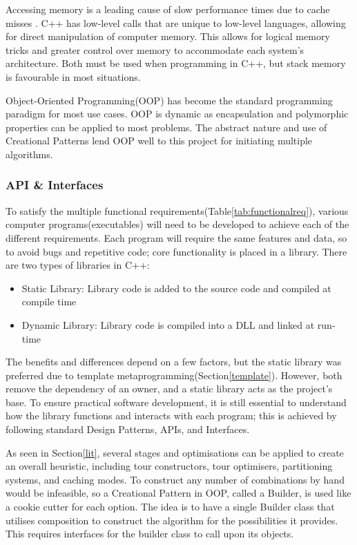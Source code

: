 Accessing memory is a leading cause of slow performance times due to cache misses \cite{drepper2007memory}. C++ has low-level calls that are unique to low-level languages, allowing for direct manipulation of computer memory. This allows for logical memory tricks and greater control over memory to accommodate each system's architecture\cite{memorymanagement}. Both must be used when programming in C++, but stack memory is favourable in most situations.

Object-Oriented Programming(OOP) has become the standard programming paradigm for most use cases. OOP is dynamic as encapsulation and polymorphic properties can be applied to most problems. The abstract nature and use of Creational Patterns lend OOP well to this project for initiating multiple algorithms.  

\subsubsection{API \& Interfaces}
\label{sec:API}

To satisfy the multiple functional requirements(Table\ref{tab:functionalreq}), various computer programs(executables) will need to be developed to achieve each of the different requirements. Each program will require the same features and data, so to avoid bugs and repetitive code; core functionality is placed in a library. There are two types of libraries in C++:

\begin{itemize}
    \item Static Library: Library code is added to the source code and compiled at compile time
    \item Dynamic Library: Library code is compiled into a DLL and linked at run-time
\end{itemize}

The benefits and differences depend on a few factors, but the static library was preferred due to template metaprogramming(Section\ref{template}). However, both remove the dependency of an owner, and a static library acts as the project's base. To ensure practical software development, it is still essential to understand how the library functions and interacts with each program; this is achieved by following standard Design Patterns, APIs, and Interfaces.

As seen in Section\ref{lit}, several stages and optimisations can be applied to create an overall heuristic, including tour constructors, tour optimisers, partitioning systems, and caching modes. To construct any number of combinations by hand would be infeasible, so a Creational Pattern in OOP, called a Builder\cite{refactoringGuruBuilder}, is used like a cookie cutter for each option. The idea is to have a single Builder class that utilises composition to construct the algorithm for the possibilities it provides. This requires interfaces for the builder class to call upon its objects.

